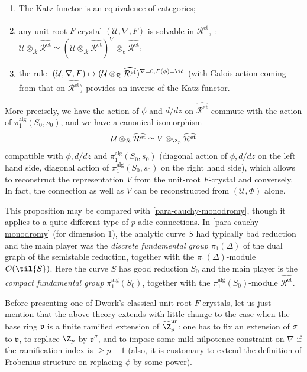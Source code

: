\begin{pro}
 \begin{enumerate}
  \item The Katz functor is an equivalence of categories;
  \item any unit-root $F$-crystal $(\mathcal{U},\nabla, F)$ is
	solvable in $\widehat{\mathcal{R}^{\mathrm{et}}}$, \ie :
	$\mathcal{U}\otimes_\mathcal{R}
	\widehat{\mathcal{R}^{\mathrm{et}}}\simeq
	(\mathcal{U}\otimes_\mathcal{R}
	\widehat{\mathcal{R}^{\mathrm{et}}})^{\nabla}\otimes_{\mathfrak{v}}
	\widehat{\mathcal{R}^{\mathrm{et}}}$;
  \item the rule  $\;(\mathcal{U},\nabla, F) \mapsto
	(\mathcal{U}\otimes_\mathcal{R}
	\widehat{\mathcal{R}^{\mathrm{et}}})^{\nabla =0, F(\phi)=\id}$
	(with Galois action coming from that on
	$\widehat{\mathcal{R}^{\mathrm{et}}}$) provides an inverse of
	the Katz functor. 
  \end{enumerate}
\end{pro}
More precisely, we have the action of $\phi$ and $d/dz$ on 
$\widehat{\mathcal{R}^{\mathrm{et}}}$ commute with the action of
$\pi_1^{\mathrm{alg}}(S_0,s_0)$, and we have a canonical isomorphism
\begin{equation*}
 \mathcal{U}\otimes_\mathcal{R}\widehat{\mathcal{R}^{\mathrm{et}}}
  \simeq V\otimes_{\Z_p}\widehat{\mathcal{R}^{\mathrm{et}}}
\end{equation*}
compatible with $\phi, d/dz$ and $\pi_1^{\mathrm{alg}}(S_0,s_0)$
(diagonal action of $\phi, d/dz$ on the left hand side, diagonal action
of $\pi_1^{\mathrm{alg}}(S_0,s_0)$ on the right hand side), which allows
to reconstruct the representation $V$ from the unit-root $F$-crystal and
conversely. In fact, the connection as well as $V$ can be reconstructed
from $(\mathcal{U}, \Phi)$ alone.

This proposition may be compared with \ref{para-cauchy-monodromy}, though it
applies to a quite different type of $p$-adic connections. In
\ref{para-cauchy-monodromy} (for dimension 1), the analytic curve $S$ had
typically bad reduction and the main player was the \emph{discrete
fundamental group} $\pi_1(\Delta)$ of the dual graph of the semistable
reduction, together with the $\pi_1(\Delta)$-module
$\mathcal{O}(\til{S})$. Here the curve $S$ has good reduction
$S_0$ and the main player is the \emph{compact fundamental group}
$\pi_1^{\mathrm{alg}}(S_0)$, together with the
$\pi_1^{\mathrm{alg}}(S_0)$-module $\widehat{\mathcal{R}^{\mathrm{et}}}$.

Before presenting one of Dwork's classical unit-root $F$-crystals, let
us just mention that the above theory extends with little change to the
case when the base ring $\mathfrak{v}$ is a finite ramified extension of
${\widehat{\Z}}^{\mathrm{ur}}_p$: one has to fix an extension of $\sigma$ to
$\mathfrak{v}$, to replace ${\Z}_p$ by $\mathfrak{v}^{\sigma}$, and
to impose some mild nilpotence constraint on $\nabla$ if the
ramification index is $\geq p-1$ (also, it is customary to extend the
definition of Frobenius structure on replacing $\phi$ by some power).

